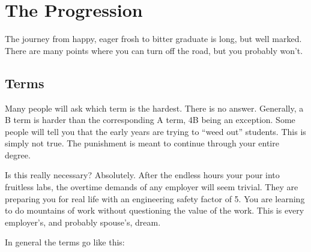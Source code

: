 \documentclass{book}
\begin{document}
\chapter{The Progression}
The journey from happy, eager frosh to bitter graduate is long, but well marked. There are many points where you can turn off the road, but you probably won't.

\section{Terms}
Many people will ask which term is the hardest. There is no answer. Generally, a B term is harder than the corresponding A term, 4B being an exception. Some people will tell you that the early years are trying to ``weed out'' students. This is simply not true. The punishment is meant to continue through your entire degree.

Is this really necessary? Absolutely. After the endless hours your pour into fruitless labs, the overtime demands of any employer will seem trivial. They are preparing you for real life with an engineering safety factor of 5. You are learning to do mountains of work without questioning the value of the work. This is every employer's, and probably spouse's, dream.

In general the terms go like this:
\end{document}
